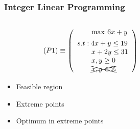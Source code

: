 \documentclass{beamer}
\begin{document}
        \begin{frame}
        \frametitle{Integer Linear Programming}
        
        \begin{columns}[T] %
        \begin{column}{.48\textwidth}
        \begin{equation*}
            (P1) \equiv 	\left( \begin{array}{l}
	                        \qquad \max \hspace{2pt}  6x + y  \vspace{4pt} \\ 
	                        s.t: 4x + y \leq 19 \\
	                        \qquad x + 2y \leq 31 \\
	                        \qquad x,y\geq 0 \\
	                        \qquad \xcancel{x,y \in \mathbb{Z}}
	                        \end{array} \right)
        \end{equation*}
        \begin{itemize}
            \item Feasible region
            \item Extreme points
            \item Optimum in extreme points
        \end{itemize}
        \end{column}%
        \hfill%
        \begin{column}{.48\textwidth}

\end{column}
\end{columns}
\end{frame}
\end{document}
